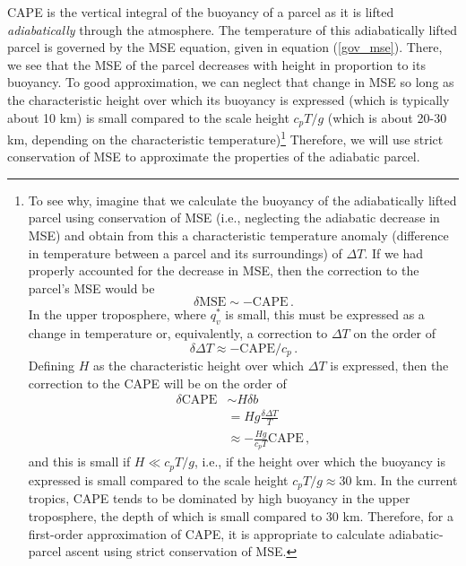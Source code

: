 \documentclass[12pt]{article}
\newcommand{\mse}{{\text{MSE}}}
\begin{document}
CAPE is the vertical integral of the buoyancy of a parcel as it is lifted {\it adiabatically} through the atmosphere.  The temperature of this adiabatically lifted parcel is governed by the MSE equation, given in equation (\ref{gov_mse}).  There, we see that the MSE of the parcel decreases with height in proportion to its buoyancy.  To good approximation, we can neglect that change in MSE so long as the characteristic height over which its buoyancy is expressed (which is typically about 10 km) is small compared to the scale height $c_p T/g$ (which is about 20-30 km, depending on the characteristic temperature)\footnote{To see why, imagine that we calculate the buoyancy of the adiabatically lifted parcel using conservation of MSE (i.e., neglecting the adiabatic decrease in MSE) and obtain from this a characteristic temperature anomaly (difference in temperature between a parcel and its surroundings) of $\Delta T$.  If we had properly accounted for the decrease in MSE, then the correction to the parcel's MSE would be
\[
\delta \mse{} \sim -\text{CAPE} \, .
\]
In the upper troposphere, where $q_v^*$ is small, this must be expressed as a change in temperature or, equivalently, a correction to $\Delta T$ on the order of
\[
\delta \Delta T \approx -\text{CAPE}/c_p \, .
\]
Defining $H$ as the characteristic height over which $\Delta T$ is expressed, then the correction to the CAPE will be on the order of
\begin{align}
\delta \text{CAPE} &\sim H \delta b \\
&= H g \frac{\delta \Delta T}{T} \\
&\approx -\frac{H g}{c_p T} \text{CAPE} \, ,
\end{align}
and this is small if $H \ll c_p T /g$, i.e., if the height over which the buoyancy is expressed is small compared to the scale height $c_pT/g \approx 30$ km.  In the current tropics, CAPE tends to be dominated by high buoyancy in the upper troposphere, the depth of which is small compared to 30 km.  Therefore, for a first-order approximation of CAPE, it is appropriate to calculate adiabatic-parcel ascent using strict conservation of MSE.}  Therefore, we will use strict conservation of MSE to approximate the properties of the adiabatic parcel.
\end{document}
